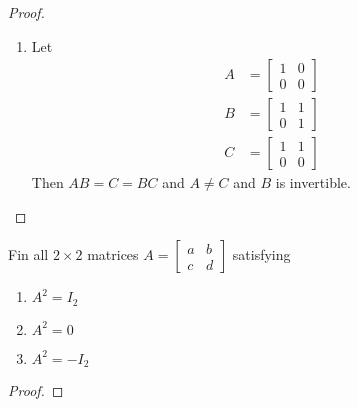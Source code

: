 \begin{exercise}
\begin{proof}
\begin{enumerate}
            \item Let
            \begin{align*}
                A &= \begin{bmatrix} 1 & 0 \\ 0 & 0 \end{bmatrix} \\
                B &= \begin{bmatrix} 1 & 1 \\ 0 & 1 \end{bmatrix} \\
                C &= \begin{bmatrix} 1 & 1 \\ 0 & 0 \end{bmatrix}
            \end{align*}
            Then \( AB = C = BC \) and \( A \neq C \) and \( B \) is invertible.
        \end{enumerate}
    \end{proof}
\end{exercise} %

\begin{exercise} \label{e1.4.9}
    Fin all \( 2 \times 2 \) matrices \( A = \begin{bmatrix} a & b \\ c & d \end{bmatrix} \) satisfying
    
    \begin{enumerate}
        \item \( A^2 = I_2 \)
        \item \( A^2 = 0 \)
        \item \( A^2 = -I_2 \)
    \end{enumerate}
    
    \begin{proof}
    \end{proof}
\end{exercise} %

\begin{exercise} \label{e1.4.10}
\end{exercise} %

